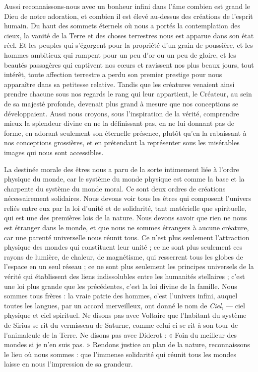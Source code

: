 \documentclass[a4paper, 11pt, oneside]{article}
\begin{document}
Aussi reconnaissons-nous avec un bonheur infini dans l'âme combien est grand le Dieu de notre adoration, et combien il est élevé au-dessus des créations de l'esprit humain. Du haut des sommets éternels où nous a portés la contemplation des cieux, la vanité de la Terre et des choses terrestres nous est apparue dans son état réel. Et les peuples qui s'égorgent pour la propriété d'un grain de poussière, et les hommes ambitieux qui rampent pour un peu d'or ou un peu de gloire, et les beautés passagères qui captivent nos cœurs et ravissent nos plus beaux jours, tout intérêt, toute affection terrestre a perdu son premier prestige pour nous apparaître dans sa petitesse relative. Tandis que les créatures venaient ainsi prendre chacune sous nos regards le rang qui leur appartient, le Créateur, au sein de sa majesté profonde, devenait plus grand à mesure que nos conceptions se développaient. Aussi nous croyons, sous l'inspiration de la vérité, comprendre mieux la splendeur divine en ne la définissant pas, en ne lui donnant pas de forme, en adorant seulement son éternelle présence, plutôt qu'en la rabaissant à nos conceptions grossières, et en prétendant la représenter sous les misérables images qui nous sont accessibles.

La destinée morale des êtres nous a paru de la sorte intimement liée à l'ordre physique du monde, car le système du monde physique est comme la base et la charpente du système du monde moral. Ce sont deux ordres de créations nécessairement solidaires. Nous devons voir tous les êtres qui composent l'univers reliés entre eux par la loi d'unité et de solidarité, tant matérielle que spirituelle, qui est une des premières lois de la nature. Nous devons savoir que rien ne nous est étranger dans le monde, et que nous ne sommes étrangers à aucune créature, car une parenté universelle nous réunit tous. Ce n'est plus seulement l'attraction physique des mondes qui constituent leur unité ; ce ne sont plus seulement ces rayons de lumière, de chaleur, de magnétisme, qui resserrent tous les globes de l'espace en un seul réseau ; ce ne sont plus seulement les principes universels de la vérité qui établissent des liens indissolubles entre les humanités stellaires ; c'est une loi plus grande que les précédentes, c'est la loi divine de la famille. Nous sommes tous frères : la vraie patrie des hommes, c'est l'univers infini, auquel toutes les langues, par un accord merveilleux, ont donné le nom de \emph{Ciel}, --- ciel physique et ciel spirituel. Ne disons pas avec Voltaire que l'habitant du système de Sirius se rit du vermisseau de Saturne, comme celui-ci se rit à son tour de l'animalcule de la Terre. Ne disons pas avec Diderot : « Foin du meilleur des mondes si je n'en suis pas. » Rendons justice au plan de la nature, reconnaissons le lieu où nous sommes : que l'immense solidarité qui réunit tous les mondes laisse en nous l'impression de sa grandeur.
\end{document}
